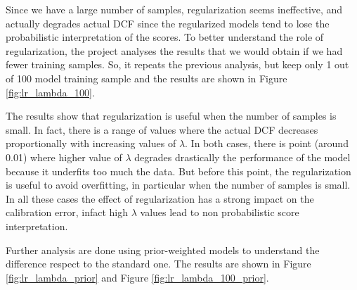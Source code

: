 \documentclass{article}
\begin{document}
Since we have a large number of samples, regularization seems ineffective, and actually degrades actual DCF since the regularized models tend to lose the probabilistic interpretation of the scores. To better understand the role of regularization, the project analyses the results that we would obtain if we had fewer training samples. So, it repeats the previous analysis, but keep only 1 out of 100 model training sample and the results are shown in Figure \ref{fig:lr_lambda_100}.

The results show that regularization is useful when the number of samples is small. In fact, there is a range of values where the actual DCF decreases proportionally with increasing values of $\lambda$. In both cases, there is point (around 0.01) where higher value of $\lambda$ degrades drastically the performance of the model because it underfits too much the data. But before this point, the regularization is useful to avoid overfitting, in particular when the number of samples is small. In all these cases the effect of regularization has a strong impact on the calibration error, infact high $\lambda$ values lead to non probabilistic score interpretation.

Further analysis are done using prior-weighted models to understand the difference respect to the standard one. The results are shown in Figure \ref{fig:lr_lambda_prior} and Figure \ref{fig:lr_lambda_100_prior}.
\end{document}
